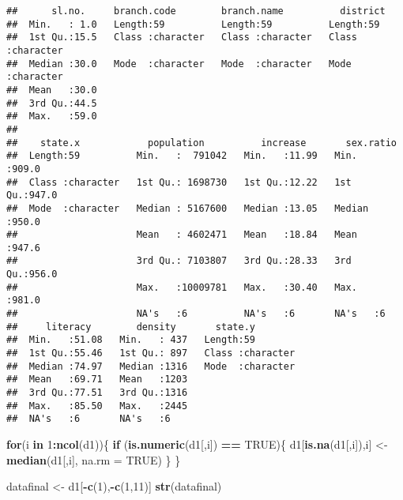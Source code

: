 \documentclass[]{article}
\newenvironment{Shaded}{\begin{snugshade}}{\end{snugshade}}
\newcommand{\KeywordTok}[1]{\textcolor[rgb]{0.13,0.29,0.53}{\textbf{#1}}}
\newcommand{\DataTypeTok}[1]{\textcolor[rgb]{0.13,0.29,0.53}{#1}}
\newcommand{\DecValTok}[1]{\textcolor[rgb]{0.00,0.00,0.81}{#1}}
\newcommand{\StringTok}[1]{\textcolor[rgb]{0.31,0.60,0.02}{#1}}
\newcommand{\OtherTok}[1]{\textcolor[rgb]{0.56,0.35,0.01}{#1}}
\newcommand{\ControlFlowTok}[1]{\textcolor[rgb]{0.13,0.29,0.53}{\textbf{#1}}}
\newcommand{\OperatorTok}[1]{\textcolor[rgb]{0.81,0.36,0.00}{\textbf{#1}}}
\newcommand{\NormalTok}[1]{#1}
\begin{document}
\begin{verbatim}
##      sl.no.     branch.code        branch.name          district        
##  Min.   : 1.0   Length:59          Length:59          Length:59         
##  1st Qu.:15.5   Class :character   Class :character   Class :character  
##  Median :30.0   Mode  :character   Mode  :character   Mode  :character  
##  Mean   :30.0                                                           
##  3rd Qu.:44.5                                                           
##  Max.   :59.0                                                           
##                                                                         
##    state.x            population          increase       sex.ratio    
##  Length:59          Min.   :  791042   Min.   :11.99   Min.   :909.0  
##  Class :character   1st Qu.: 1698730   1st Qu.:12.22   1st Qu.:947.0  
##  Mode  :character   Median : 5167600   Median :13.05   Median :950.0  
##                     Mean   : 4602471   Mean   :18.84   Mean   :947.6  
##                     3rd Qu.: 7103807   3rd Qu.:28.33   3rd Qu.:956.0  
##                     Max.   :10009781   Max.   :30.40   Max.   :981.0  
##                     NA's   :6          NA's   :6       NA's   :6      
##     literacy        density       state.y         
##  Min.   :51.08   Min.   : 437   Length:59         
##  1st Qu.:55.46   1st Qu.: 897   Class :character  
##  Median :74.97   Median :1316   Mode  :character  
##  Mean   :69.71   Mean   :1203                     
##  3rd Qu.:77.51   3rd Qu.:1316                     
##  Max.   :85.50   Max.   :2445                     
##  NA's   :6       NA's   :6
\end{verbatim}

\begin{Shaded}
\begin{Highlighting}[]
\ControlFlowTok{for}\NormalTok{(i }\ControlFlowTok{in} \DecValTok{1}\OperatorTok{:}\KeywordTok{ncol}\NormalTok{(d1))\{}
    \ControlFlowTok{if}\NormalTok{ (}\KeywordTok{is.numeric}\NormalTok{(d1[,i]) }\OperatorTok{==}\StringTok{ }\OtherTok{TRUE}\NormalTok{)\{}
\NormalTok{      d1[}\KeywordTok{is.na}\NormalTok{(d1[,i]),i] <-}\StringTok{ }\KeywordTok{median}\NormalTok{(d1[,i], }\DataTypeTok{na.rm =} \OtherTok{TRUE}\NormalTok{)}
\NormalTok{    \}}
\NormalTok{  \}}

\NormalTok{datafinal <-}\StringTok{ }\NormalTok{d1[}\OperatorTok{-}\KeywordTok{c}\NormalTok{(}\DecValTok{1}\NormalTok{),}\OperatorTok{-}\KeywordTok{c}\NormalTok{(}\DecValTok{1}\NormalTok{,}\DecValTok{11}\NormalTok{)]}
\KeywordTok{str}\NormalTok{(datafinal)}
\end{Highlighting}
\end{Shaded}
\end{document}
